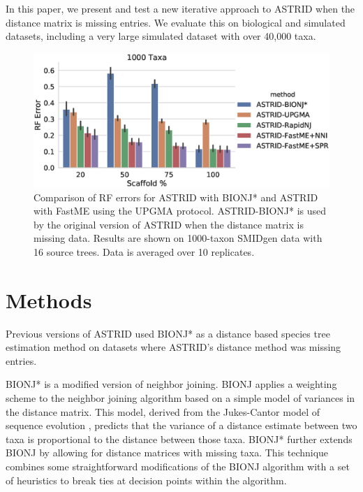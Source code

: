In this paper, we present and test a new iterative approach to ASTRID when the distance matrix is missing entries. We evaluate this on biological and simulated datasets, including a very large simulated dataset with over 40,000 taxa.

\begin{figure}[!htb]
    \centering
    \includegraphics[width=\textwidth]{astrid-missing-figs/astrid-bionj-errs.eps}
    \caption[Error rates for ASTRID with BIONJ* and ASTRID with FastME using the UPGMA protocol]{Comparison of RF errors for ASTRID with BIONJ* and ASTRID with FastME using the UPGMA protocol. ASTRID-BIONJ* is used by the original version of ASTRID when the distance matrix is missing data. Results are shown on 1000-taxon SMIDgen data with 16 source trees. Data is averaged over 10 replicates.}
    \label{astrid-missing::fig:astrid-bionj-errs}
\end{figure}

\section{Methods}
Previous versions of ASTRID used BIONJ* as a distance based species tree estimation method on datasets where ASTRID's distance method was missing entries.

BIONJ* is a modified version of neighbor joining. BIONJ \cite{gascuel1997bionj} applies a weighting scheme to the neighbor joining algorithm based on a simple model of variances in the distance matrix. This model, derived from the Jukes-Cantor model of sequence evolution \cite{jukes1969evolution}, predicts that the variance of a distance estimate between two taxa is proportional to the distance between those taxa. BIONJ* further extends BIONJ by allowing for distance matrices with missing taxa. This technique combines some straightforward modifications of the BIONJ algorithm with a set of heuristics to break ties at decision points within the algorithm.


